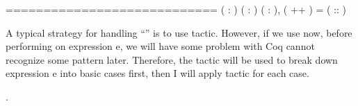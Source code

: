 \coqdoceol
\coqdocemptyline
{} \coqdoceol
\coqdocnoindent
\coqdoceol
\coqdocindent{1.00em}
============================\coqdoceol
\coqdocindent{1.50em}
\coqdockw{\ensuremath{\forall}} ( : ) ( :  ) ( : ),\coqdoceol
\coqdocindent{1.50em}
 (  ++ )  =   (  :: )  

\coqdocemptyline


 \vspace{0.5em}  \noindent A typical strategy for handling ``\coqdockw{\ensuremath{\forall}}'' is to use  tactic. However, if we use  now, before performing  on expression e, we will have some problem with Coq cannot recognize some pattern later. Therefore, the tactic  will be used to break down expression e into basic cases first, then I will apply  tactic for each case.  \vspace{0.5em} \begin{coqdoccode}
\coqdocemptyline
\coqdocnoindent
{} .\coqdoceol
\end{coqdoccode}


